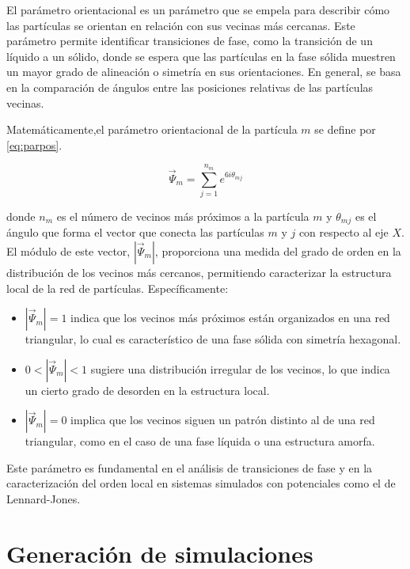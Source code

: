 El parámetro orientacional  es un parámetro que se empela para describir cómo las partículas se orientan en relación con sus vecinas más cercanas. Este parámetro permite identificar transiciones de fase, como la transición de un líquido a un sólido, donde se espera que las partículas en la fase sólida muestren un mayor grado de alineación o simetría en sus orientaciones. En general, se basa en la comparación de ángulos entre las posiciones relativas de las partículas vecinas.

\vspace{\baselineskip}

Matemáticamente,el parámetro orientacional de la partícula \( m \) se define por \ref{eq:parpos}.

\begin{equation} \label{eq:parpos}
	\vec{\Psi}_{m} = \sum_{j=1}^{n_{m}} e^{6i\theta_{mj}}
\end{equation}

donde \( n_{m} \) es el número de vecinos más próximos a la partícula \( m \) y \( \theta_{mj} \) es el ángulo que forma el vector que conecta las partículas \( m \) y \( j \) con respecto al eje \( X \). El módulo de este vector, \( |\vec{\Psi}_{m}| \), proporciona una medida del grado de orden en la distribución de los vecinos más cercanos, permitiendo caracterizar la estructura local de la red de partículas. Específicamente:

\begin{itemize}

	\item \( |\vec{\Psi}_{m}| = 1 \) indica que los vecinos más próximos están organizados en una red triangular, lo cual es característico de una fase sólida con simetría hexagonal.
	\item \( 0 < |\vec{\Psi}_{m}| < 1 \) sugiere una distribución irregular de los vecinos, lo que indica un cierto grado de desorden en la estructura local.
	\item \( |\vec{\Psi}_{m}| = 0 \) implica que los vecinos siguen un patrón distinto al de una red triangular, como en el caso de una fase líquida o una estructura amorfa.

\end{itemize}

Este parámetro es fundamental en el análisis de transiciones de fase y en la caracterización del orden local en sistemas simulados con potenciales como el de Lennard-Jones.

\section{Generación de simulaciones}

